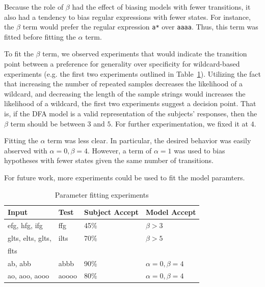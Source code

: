 \documentclass[10pt,letterpaper]{article}
\begin{document}
Because the role of $\beta$ had the effect of biasing models with fewer transitions, it also had a tendency to bias regular expressions with fewer states. For instance, the $\beta$ term would prefer the regular expression \verb!a*! over \verb!aaaa!. Thus, this term was fitted before fitting the $\alpha$ term.

To fit the $\beta$ term, we observed experiments that would indicate the transition point between a preference for generality over specificity for wildcard-based experiments (e.g. the first two experiments outlined in Table~\ref{parameter-table}). Utilizing the fact that increasing the number of repeated samples decreases the likelihood of a wildcard, and decreasing the length of the sample strings would increases the likelihood of a wildcard, the first two experiments suggest a decision point. That is, if the DFA model is a valid representation of the subjects' responses, then the $\beta$ term should be between $3$ and $5$. For further experimentation, we fixed it at $4$.

Fitting the $\alpha$ term was less clear. In particular, the desired behavior was easily abserved with $\alpha=0,\beta=4$. However, a term of $\alpha=1$ was used to bias hypotheses with fewer states given the same number of transitions.

For future work, more experiments could be used to fit the model paramters.

\begin{table}[!ht]
\begin{center} 
\caption{Parameter fitting experiments} 
\label{parameter-table} 
\vskip 0.12in
\begin{tabular}{llll} 
\hline
Input  & Test & Subject Accept & Model Accept
\\ \hline
efg, hfg, ifg & ffg & 45\% & $\beta > 3$
\\ \hline
glts, elts, glts, & ilts & 70\% & $\beta > 5$
\\ flts
\\ \hline
ab, abb & abbb & 90\% & $\alpha = 0, \beta = 4$
\\ \hline
ao, aoo, aooo & aoooo & 80\% & $\alpha = 0, \beta=4$
\\ \hline
\end{tabular} 
\end{center} 
\end{table}
\end{document}
